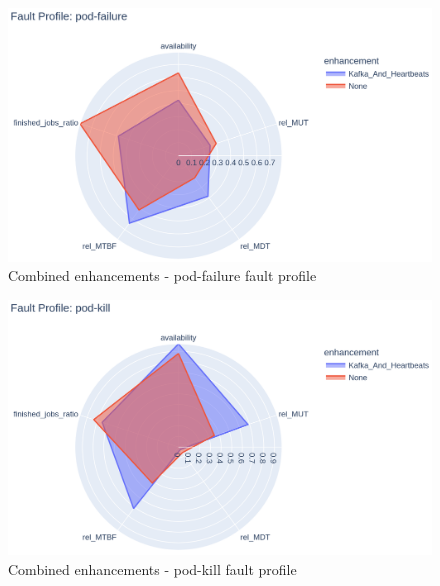 \begin{figure}[H]
	\centering
	\includegraphics[width=140mm, keepaspectratio]{figures/kafka_and_hb_with_base_pod-failure.png}
	\caption{Combined enhancements - pod-failure fault profile}
	\label{fig:combined-results-pod-failure}
\end{figure}

\begin{figure}[H]
	\centering
	\includegraphics[width=140mm, keepaspectratio]{figures/kafka_and_hb_with_base_pod-kill.png}
	\caption{Combined enhancements - pod-kill fault profile}
	\label{fig:combined-results-pod-kill}
\end{figure}

